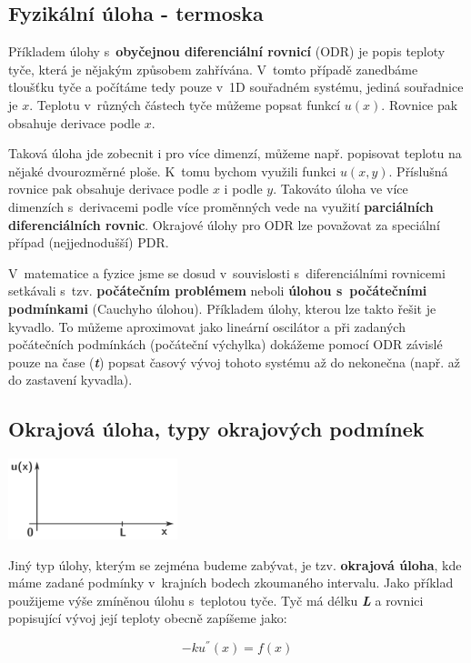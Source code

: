 \subsection{Fyzikální úloha - termoska}
Příkladem úlohy s~\textbf{obyčejnou diferenciální rovnicí} (ODR) je popis teploty tyče,
která je nějakým způsobem zahřívána. V~tomto případě zanedbáme tloušťku
tyče a počítáme tedy pouze v~1D souřadném systému, jediná souřadnice je
$x$. Teplotu v~různých částech tyče můžeme popsat funkcí
$u(x)$. Rovnice pak obsahuje derivace podle $x$.

Taková úloha jde zobecnit i pro více dimenzí, můžeme např. popisovat
teplotu na nějaké dvourozměrné ploše. K~tomu bychom využili funkci
$u(x, y)$. Příslušná rovnice pak obsahuje derivace podle $x$ i
podle $y$. Takováto úloha ve více dimenzích s~derivacemi podle více
proměnných vede na využití \textbf{parciálních diferenciálních rovnic}.
Okrajové úlohy pro ODR lze považovat za speciální případ (nejjednodušší) PDR.

V~matematice a fyzice jsme se dosud v~souvislosti s~diferenciálními
rovnicemi setkávali s~tzv. \textbf{počátečním problémem} neboli
\textbf{úlohou s~počátečními podmínkami} (Cauchyho úlohou). Příkladem
úlohy, kterou lze takto řešit je kyvadlo. To můžeme aproximovat jako
lineární oscilátor a při zadaných počátečních podmínkách (počáteční
výchylka) dokážeme pomocí ODR závislé pouze na čase (\emph{\textbf{t}})
popsat časový vývoj tohoto systému až do nekonečna (např. až do
zastavení kyvadla).

\subsection{Okrajová úloha, typy okrajových podmínek}

\includegraphics[width=1.93264in,height=0.92708in]{img/image7.png}

Jiný
typ úlohy, kterým se zejména budeme zabývat, je tzv. \textbf{okrajová
úloha}, kde máme zadané podmínky v~krajních bodech zkoumaného intervalu.
Jako příklad použijeme výše zmíněnou úlohu s~teplotou tyče. Tyč má délku
\emph{\textbf{L}} a rovnici popisující vývoj její teploty obecně
zapíšeme jako:

\[- k  u^{''}\left( x \right) = f(x)\]

